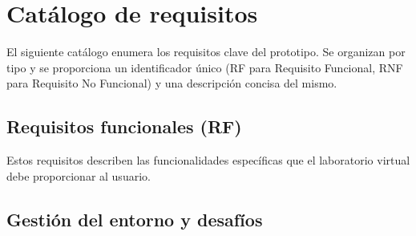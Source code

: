 \section{Catálogo de requisitos}
El siguiente catálogo enumera los requisitos clave del prototipo. Se organizan por tipo y se proporciona un identificador único (RF para Requisito Funcional, RNF para Requisito No Funcional) y una descripción concisa del mismo.

\subsection{Requisitos funcionales (RF)}
Estos requisitos describen las funcionalidades específicas que el laboratorio virtual debe proporcionar al usuario.

\subsection{Gestión del entorno y desafíos}

